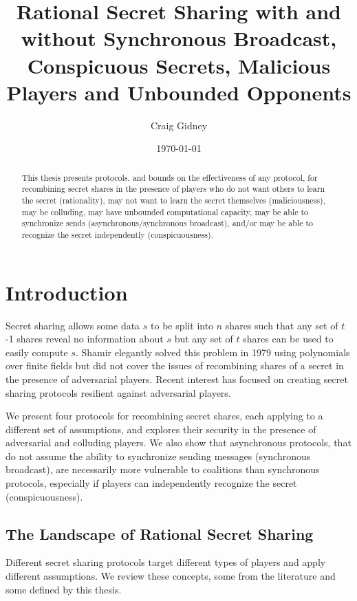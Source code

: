 \documentclass{dalcsthesis}
\title{Rational Secret Sharing with and without Synchronous Broadcast, Conspicuous Secrets, Malicious Players and Unbounded Opponents}
\author{Craig Gidney}
\date{\today}
\begin{document}
\mcs
\maketitle

\begin{abstract}
This thesis presents protocols, and bounds on the effectiveness of any protocol, for recombining secret shares in the presence of players who do not want others to learn the secret (rationality), may not want to learn the secret themselves (maliciousness), may be colluding, may have unbounded computational capacity, may be able to synchronize sends (asynchronous/synchronous broadcast), and/or may be able to recognize the secret independently (conspicuousness).
\end{abstract}

\chapter{Introduction}

Secret sharing allows some data $s$ to be split into $n$ shares such that any set of $t$-1 shares reveal no information about $s$ but any set of $t$ shares can be used to easily compute $s$. Shamir \cite{shamir79} elegantly solved this problem in 1979 using polynomials over finite fields but did not cover the issues of recombining shares of a secret in the presence of adversarial players. Recent interest \cite{fuch10, ong09, kol08, maleka08, abraham06, gordon06} has focused on creating secret sharing protocols resilient against adversarial players.

We present four protocols for recombining secret shares, each applying to a different set of assumptions, and explores their security in the presence of adversarial and colluding players. We also show that asynchronous protocols, that do not assume the ability to synchronize sending messages (synchronous broadcast), are necessarily more vulnerable to coalitions than synchronous protocols, especially if players can independently recognize the secret (conspicuousness).



\section{The Landscape of Rational Secret Sharing}

Different secret sharing protocols target different types of players and apply different assumptions. We review these concepts, some from the literature and some defined by this thesis.
\end{document}

